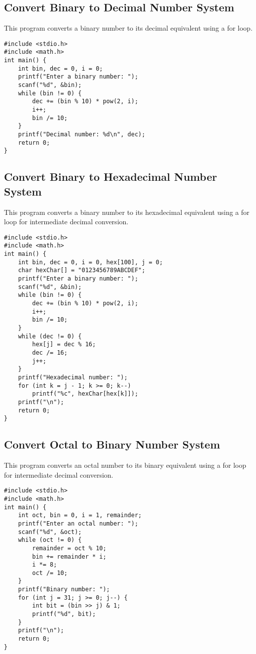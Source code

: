 \documentclass[a4paper,12pt]{article}
\begin{document}
\newpage

\subsection{Convert Binary to Decimal Number System}
This program converts a binary number to its decimal equivalent using a for loop.

\begin{lstlisting}[caption={Convert Binary to Decimal Number System}]
#include <stdio.h>
#include <math.h>
int main() {
    int bin, dec = 0, i = 0;
    printf("Enter a binary number: ");
    scanf("%d", &bin);
    while (bin != 0) {
        dec += (bin % 10) * pow(2, i);
        i++;
        bin /= 10;
    }
    printf("Decimal number: %d\n", dec);
    return 0;
}
\end{lstlisting}

\newpage

\subsection{Convert Binary to Hexadecimal Number System}
This program converts a binary number to its hexadecimal equivalent using a for loop for intermediate decimal conversion.

\begin{lstlisting}[caption={Convert Binary to Hexadecimal Number System}]
#include <stdio.h>
#include <math.h>
int main() {
    int bin, dec = 0, i = 0, hex[100], j = 0;
    char hexChar[] = "0123456789ABCDEF";
    printf("Enter a binary number: ");
    scanf("%d", &bin);
    while (bin != 0) {
        dec += (bin % 10) * pow(2, i);
        i++;
        bin /= 10;
    }
    while (dec != 0) {
        hex[j] = dec % 16;
        dec /= 16;
        j++;
    }
    printf("Hexadecimal number: ");
    for (int k = j - 1; k >= 0; k--)
        printf("%c", hexChar[hex[k]]);
    printf("\n");
    return 0;
}
\end{lstlisting}

\newpage

\subsection{Convert Octal to Binary Number System}
This program converts an octal number to its binary equivalent using a for loop for intermediate decimal conversion.

\begin{lstlisting}[caption={Convert Octal to Binary Number System}]
#include <stdio.h>
#include <math.h>
int main() {
    int oct, bin = 0, i = 1, remainder;
    printf("Enter an octal number: ");
    scanf("%d", &oct);
    while (oct != 0) {
        remainder = oct % 10;
        bin += remainder * i;
        i *= 8;
        oct /= 10;
    }
    printf("Binary number: ");
    for (int j = 31; j >= 0; j--) {
        int bit = (bin >> j) & 1;
        printf("%d", bit);
    }
    printf("\n");
    return 0;
}
\end{lstlisting}
\end{document}
